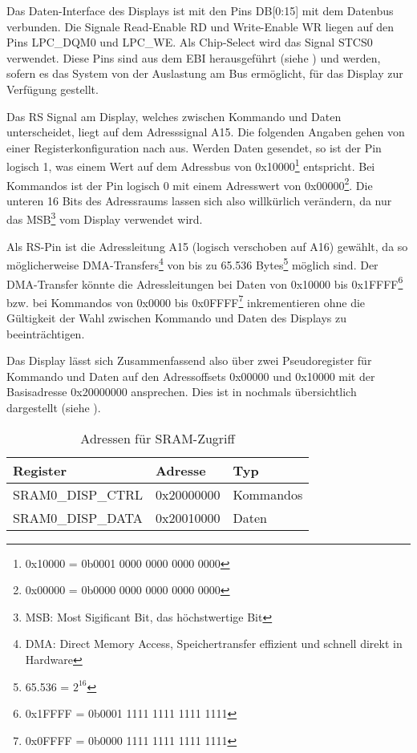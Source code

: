 Das Daten-Interface des Displays ist mit den Pins DB[0:15] mit dem Datenbus verbunden. Die Signale Read-Enable RD und Write-Enable WR liegen auf den Pins LPC\_DQM0 und LPC\_WE. Als Chip-Select wird das Signal STCS0 verwendet. Diese Pins sind aus dem EBI herausgeführt (siehe ) und werden, sofern es das System von der Auslastung am Bus ermöglicht, für das Display zur Verfügung gestellt.

Das RS Signal am Display, welches zwischen Kommando und Daten unterscheidet, liegt auf dem Adresssignal A15. Die folgenden Angaben gehen von einer Registerkonfiguration nach  aus. Werden Daten gesendet, so ist der Pin logisch 1, was einem Wert auf dem Adressbus von 0x10000\footnote{0x10000 = 0b0001 0000 0000 0000 0000} entspricht. Bei Kommandos ist der Pin logisch 0 mit einem Adresswert von 0x00000\footnote{0x00000 = 0b0000 0000 0000 0000 0000}. Die unteren 16 Bits des Adressraums lassen sich also willkürlich verändern, da nur das MSB\footnote{MSB: Most Sigificant Bit, das höchstwertige Bit} vom Display verwendet wird. 

Als RS-Pin ist die Adressleitung A15 (logisch verschoben auf A16) gewählt, da so möglicherweise DMA-Transfers\footnote{DMA: Direct Memory Access, Speichertransfer effizient und schnell direkt in Hardware} von bis zu 65.536 Bytes\footnote{65.536 = $2^{16}$} möglich sind. Der DMA-Transfer könnte die Adressleitungen bei Daten von 0x10000 bis 0x1FFFF\footnote{0x1FFFF = 0b0001 1111 1111 1111 1111} bzw. bei Kommandos von 0x0000 bis 0x0FFFF\footnote{0x0FFFF = 0b0000 1111 1111 1111 1111} inkrementieren ohne die Gültigkeit der Wahl zwischen Kommando und Daten des Displays zu beeinträchtigen.

Das Display lässt sich Zusammenfassend also über zwei Pseudoregister für Kommando und Daten auf den Adressoffsets 0x00000 und 0x10000 mit der Basisadresse 0x20000000 ansprechen. Dies ist in  nochmals übersichtlich dargestellt (siehe \cite{NXP2010}).

\begin{table}[h]
\begin{tabular}{|p{4.5cm}|p{4cm}|p{4cm}|}\hline
\rowcolor{TableBackgroundColor} 
	\textbf{Register} 	& \textbf{Adresse} 	& \textbf{Typ} 			\\ \hline
	SRAM0\_DISP\_CTRL 	& 0x20000000		& Kommandos				\\ \hline
	SRAM0\_DISP\_DATA 	& 0x20010000 		& Daten 				\\ \hline
\end{tabular}
\caption{Adressen für SRAM-Zugriff}
\label{tab:sram_adressen}
\end{table}


